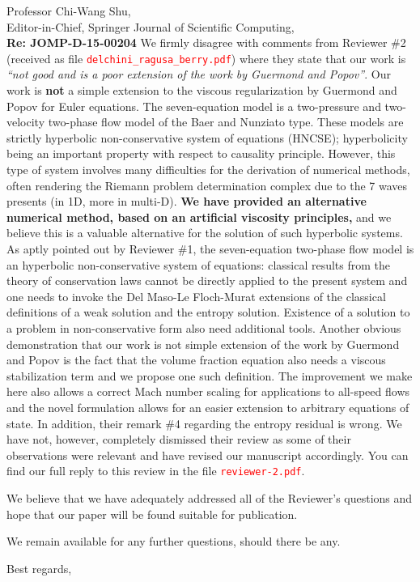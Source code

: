 \documentclass[11pt]{letter}
\newcommand{\tcr}[1]{\textcolor{red}{#1}}
\begin{document}
\begin{letter}{Professor Chi-Wang Shu, \\  Editor-in-Chief, Springer Journal of Scientific Computing,\\
\textbf{Re: JOMP-D-15-00204}}
We firmly disagree with comments from Reviewer \#2 (received as file \tcr{{\tt delchini\_ragusa\_berry.pdf}})
where they state that our work is {\it ``not good and is a poor extension of the work by Guermond and Popov''}.
%
Our work is {\bf not} a simple extension to the viscous regularization by Guermond and Popov for Euler equations. 
The seven-equation model is a two-pressure and two-velocity
two-phase flow model of the Baer and Nunziato type. These models are strictly hyperbolic 
non-conservative system of equations (HNCSE); hyperbolicity being an important property with respect to
causality principle. However, this type of system involves many difficulties 
for the derivation of numerical methods, often rendering the Riemann problem determination complex due 
to the 7 waves presents (in 1D, more in multi-D).  {\bf We have provided an alternative 
numerical method, based on an artificial viscosity principles,} and we believe this is a valuable alternative for the
solution of such hyperbolic systems.
As aptly pointed out by Reviewer \#1, the seven-equation two-phase flow model is an hyperbolic non-conservative 
system of equations: classical results from the theory of conservation laws cannot be directly
applied to the present system and one needs to invoke the Del Maso-Le Floch-Murat extensions of the 
classical definitions of a weak solution and the entropy solution. Existence of a solution to
a problem in non-conservative form also need additional tools. Another obvious demonstration that our
work is not simple extension of the work by Guermond and Popov is the fact that the volume fraction equation
also needs a  viscous stabilization term and we propose one such definition. 
%
The improvement we make here also allows a correct Mach number scaling for applications to all-speed flows and
the novel formulation allows for an easier extension to arbitrary equations of state.
In addition, their remark \#4 regarding the entropy residual is wrong. 
We have not, however, completely dismissed their review as some of their observations were relevant and have revised
our manuscript accordingly. You can find our full reply to this review in the file \tcr{{\tt reviewer-2.pdf}}.

We believe that we have adequately addressed all of the Reviewer's questions and hope that our paper will be found 
suitable for publication.

%
\bigskip

We remain available for any further questions, should there be any.



\closing{Best regards, }

\end{letter}
\end{document}
